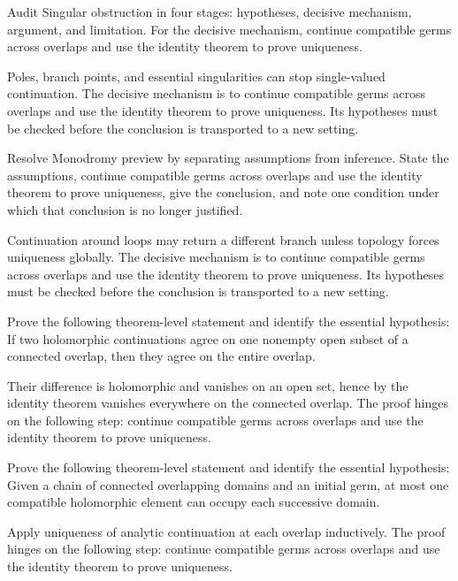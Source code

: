 \begin{problem}\label{prob:iv15-problem-07}
Audit Singular obstruction in four stages: hypotheses, decisive mechanism, argument, and limitation. For the decisive mechanism, continue compatible germs across overlaps and use the identity theorem to prove uniqueness.
\end{problem}
\begin{solution}
Poles, branch points, and essential singularities can stop single-valued continuation. The decisive mechanism is to continue compatible germs across overlaps and use the identity theorem to prove uniqueness. Its hypotheses must be checked before the conclusion is transported to a new setting.
\end{solution}

\begin{problem}\label{prob:iv15-problem-08}
Resolve Monodromy preview by separating assumptions from inference. State the assumptions, continue compatible germs across overlaps and use the identity theorem to prove uniqueness, give the conclusion, and note one condition under which that conclusion is no longer justified.
\end{problem}
\begin{solution}
Continuation around loops may return a different branch unless topology forces uniqueness globally. The decisive mechanism is to continue compatible germs across overlaps and use the identity theorem to prove uniqueness. Its hypotheses must be checked before the conclusion is transported to a new setting.
\end{solution}

\begin{problem}\label{prob:iv15-problem-09}
Prove the following theorem-level statement and identify the essential hypothesis: If two holomorphic continuations agree on one nonempty open subset of a connected overlap, then they agree on the entire overlap.
\end{problem}
\begin{solution}
Their difference is holomorphic and vanishes on an open set, hence by the identity theorem vanishes everywhere on the connected overlap. The proof hinges on the following step: continue compatible germs across overlaps and use the identity theorem to prove uniqueness.
\end{solution}

\begin{problem}\label{prob:iv15-problem-10}
Prove the following theorem-level statement and identify the essential hypothesis: Given a chain of connected overlapping domains and an initial germ, at most one compatible holomorphic element can occupy each successive domain.
\end{problem}
\begin{solution}
Apply uniqueness of analytic continuation at each overlap inductively. The proof hinges on the following step: continue compatible germs across overlaps and use the identity theorem to prove uniqueness.
\end{solution}

